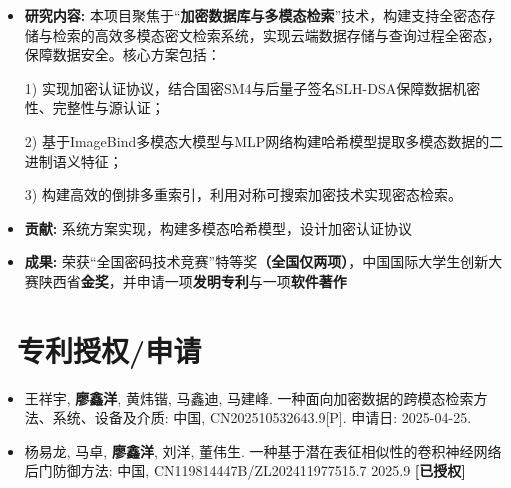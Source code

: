 \documentclass[8pt]{resume}
\begin{document}
\begin{itemize}
    \item \textbf{研究内容:}
    本项目聚焦于“\textbf{加密数据库与多模态检索}”技术，构建支持全密态存储与检索的高效多模态密文检索系统，实现云端数据存储与查询过程全密态，保障数据安全。核心方案包括：

    1) 实现加密认证协议，结合国密SM4与后量子签名SLH-DSA保障数据机密性、完整性与源认证；

    2) 基于ImageBind多模态大模型与MLP网络构建哈希模型提取多模态数据的二进制语义特征；

    3) 构建高效的倒排多重索引，利用对称可搜索加密技术实现密态检索。

    \item \textbf{贡献:} 系统方案实现，构建多模态哈希模型，设计加密认证协议
    \item \textbf{成果:} 荣获“全国密码技术竞赛”特等奖\textbf{（全国仅两项）}，中国国际大学生创新大赛陕西省\textbf{金奖}，并申请一项\textbf{发明专利}与一项\textbf{软件著作}
\end{itemize}




\section{\faCogs\ 专利授权/申请}
\begin{itemize}
    \item 王祥宇, \textbf{廖鑫洋}, 黄炜锴, 马鑫迪, 马建峰. 一种面向加密数据的跨模态检索方法、系统、设备及介质: 中国, CN202510532643.9[P]. 申请日: 2025-04-25.
    \item 杨易龙, 马卓, \textbf{廖鑫洋}, 刘洋, 董伟生. 一种基于潜在表征相似性的卷积神经网络后门防御方法: 中国, CN119814447B/ZL202411977515.7 2025.9 \textbf{[已授权]}
\end{itemize}
\end{document}
